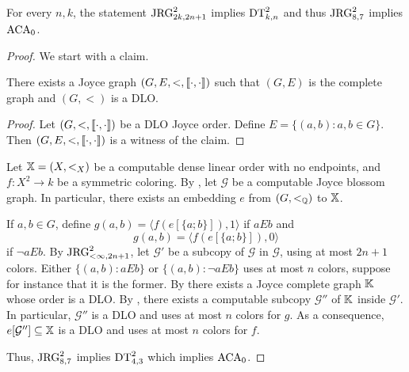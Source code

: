 \begin{theorem}
  For every $n,k$, the statement $\mathrm{JRG}^2_{2k, 2n+1}$ implies $\mathrm{DT}^{2}_{k,n}$ and thus $\mathrm{JRG}^2_{8, 7}$ implies $\mathrm{ACA}_0$.
\end{theorem}
\begin{proof}
  We start with a claim.
  \begin{claim}\label{cl:Joyce-complete-dlo-graph}
    There exists a Joyce graph $(G,E,<,\llbracket \cdot , \cdot \rrbracket)$ such that $(G,E)$ is the complete graph and $(G,<)$ is a DLO.
  \end{claim}
  \begin{proof}
    Let $(G,<,\llbracket \cdot , \cdot \rrbracket)$ be a DLO Joyce order. Define $E=\{(a,b):a,b\in G\}$. Then $(G, E,<,\llbracket \cdot , \cdot \rrbracket)$ is a witness of the claim.
  \end{proof}
  Let $\mathbb{X}=(X,<_X)$ be a computable dense linear order with no endpoints, and $f:X^2\to k$ be a symmetric coloring. By , let $\mathcal{G}$ be a computable Joyce blossom graph. In particular, there exists an embedding $e$ from $(G,<_{\mathbb{Q}})$ to $\mathbb{X}$.

  If $a,b\in G$, define $g(a,b)=\langle f(e[\{a;b\}]), 1\rangle$ if $aEb$ and
  \[
  g(a,b)=\langle f(e[\{a;b\}]), 0\rangle
  \]
  if $\lnot aEb$. By $\mathrm{JRG}^2_{<\infty, 2n+1}$, let $\mathcal{G}'$ be a subcopy of $\mathcal{G}$ in $\mathcal{G}$, using at most $2n+1$ colors. Either $\{(a,b):aEb\}$ or $\{(a,b):\lnot aEb\}$ uses at most $n$ colors, suppose for instance that it is the former. By  there exists a Joyce complete graph $\mathbb{K}$ whose order is a DLO. By , there exists a computable subcopy $\mathcal{G}''$ of $\mathbb{K}$ inside $\mathcal{G}'$. In particular, $\mathcal{G}''$ is a DLO and uses at most $n$ colors for $g$. As a consequence, $e[\mathcal{G}'']\subseteq\mathbb{X}$ is a DLO and uses at most $n$ colors for $f$.

  Thus, $\mathrm{JRG}^2_{8, 7}$ implies $\mathrm{DT}^{2}_{4,3}$ which implies $\mathrm{ACA}_0$.
\end{proof}



